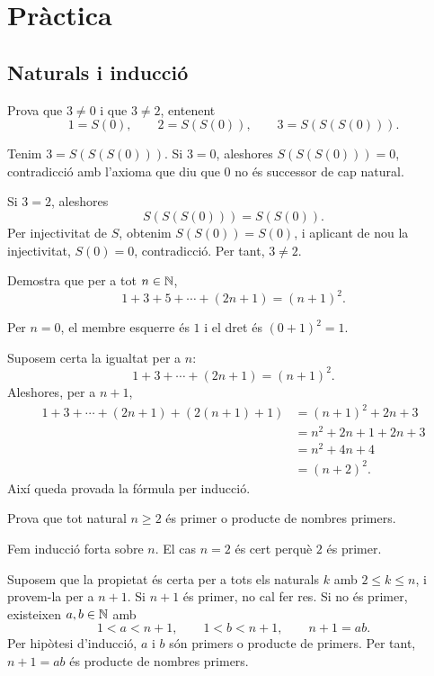 \chapter{Pràctica}
\label{cap:practica}

\section{Naturals i inducció}

\begin{exercici}
Prova que \(3\ne0\) i que \(3\ne2\), entenent
\[
1=S(0),\qquad 2=S(S(0)),\qquad 3=S(S(S(0))).
\]
\end{exercici}

\begin{solucio}
Tenim \(3=S(S(S(0)))\). Si \(3=0\), aleshores \(S(S(S(0)))=0\), contradicció amb l'axioma que diu que \(0\) no és successor de cap natural.

Si \(3=2\), aleshores
\[
S(S(S(0)))=S(S(0)).
\]
Per injectivitat de \(S\), obtenim \(S(S(0))=S(0)\), i aplicant de nou la injectivitat, \(S(0)=0\), contradicció. Per tant, \(3\ne2\).
\end{solucio}

\begin{exercici}[Inducció]
Demostra que per a tot \(n\in\mathbb{N}\),
\[
1+3+5+\cdots+(2n+1)=(n+1)^2.
\]
\end{exercici}

\begin{solucio}
Per \(n=0\), el membre esquerre és \(1\) i el dret és \((0+1)^2=1\).

Suposem certa la igualtat per a \(n\):
\[
1+3+\cdots+(2n+1)=(n+1)^2.
\]
Aleshores, per a \(n+1\),
\[
\begin{aligned}
1+3+\cdots+(2n+1)+(2(n+1)+1)
&=(n+1)^2+2n+3\\
&=n^2+2n+1+2n+3\\
&=n^2+4n+4\\
&=(n+2)^2.
\end{aligned}
\]
Així queda provada la fórmula per inducció.
\end{solucio}

\begin{exercici}
Prova que tot natural \(n\ge2\) és primer o producte de nombres primers.
\end{exercici}

\begin{solucio}
Fem inducció forta sobre \(n\). El cas \(n=2\) és cert perquè \(2\) és primer.

Suposem que la propietat és certa per a tots els naturals \(k\) amb \(2\le k\le n\), i provem-la per a \(n+1\). Si \(n+1\) és primer, no cal fer res. Si no és primer, existeixen \(a,b\in\mathbb{N}\) amb
\[
1<a<n+1,
\qquad
1<b<n+1,
\qquad
n+1=ab.
\]
Per hipòtesi d'inducció, \(a\) i \(b\) són primers o producte de primers. Per tant, \(n+1=ab\) és producte de nombres primers.
\end{solucio}

